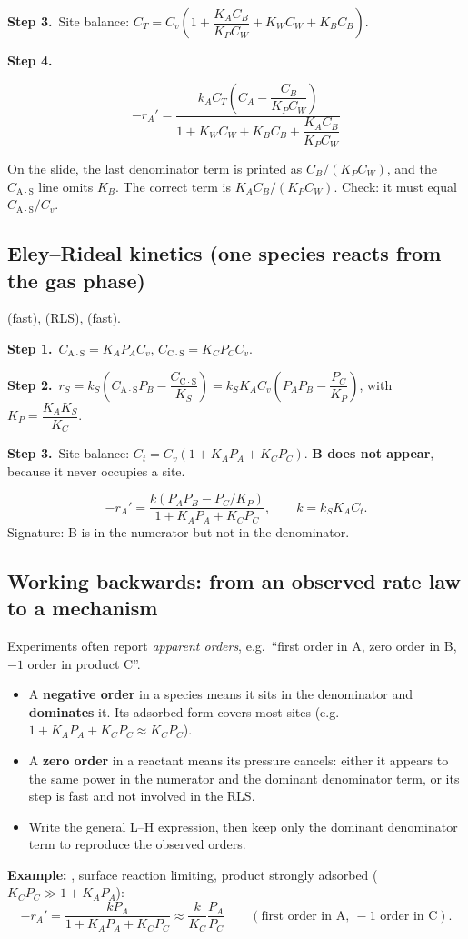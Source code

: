 \documentclass[11pt]{article}
\newcommand{\step}[1]{\par\smallskip\textcolor{stepgray}{\textbf{Step #1.}}\ }
\newcommand{\AS}[1]{\mathrm{#1\!\cdot\!S}}
\begin{document}
\step{3}Site balance: $C_T=C_v\left(1+\dfrac{K_AC_B}{K_PC_W}+K_WC_W+K_BC_B\right)$.

\step{4}
\begin{keyresult}
\[
-r_A'=\frac{k_AC_T\left(C_A-\dfrac{C_B}{K_PC_W}\right)}{1+K_WC_W+K_BC_B+\dfrac{K_AC_B}{K_PC_W}}
\]
\end{keyresult}
\begin{mistake}
On the slide, the last denominator term is printed as $C_B/(K_PC_W)$, and the $C_{\AS{A}}$ line omits $K_B$. The correct
term is $K_AC_B/(K_PC_W)$. Check: it must equal $C_{\AS{A}}/C_v$.
\end{mistake}

\subsection{Eley--Rideal kinetics (one species reacts from the gas phase)}
 (fast), \underline{} (RLS),  (fast).

\step{1}$C_{\AS{A}}=K_AP_AC_v$, \;$C_{\AS{C}}=K_CP_CC_v$.

\step{2}$r_S=k_S\left(C_{\AS{A}}P_B-\dfrac{C_{\AS{C}}}{K_S}\right)=k_SK_AC_v\left(P_AP_B-\dfrac{P_C}{K_P}\right)$, with $K_P=\dfrac{K_AK_S}{K_C}$.

\step{3}Site balance: $C_t=C_v(1+K_AP_A+K_CP_C)$. \textbf{B does not appear}, because it never occupies a site.
\begin{keyresult}
\[
-r_A'=\frac{k\left(P_AP_B-P_C/K_P\right)}{1+K_AP_A+K_CP_C},\qquad k=k_SK_AC_t .
\]
Signature: B is in the numerator but not in the denominator.
\end{keyresult}

\subsection{Working backwards: from an observed rate law to a mechanism}
Experiments often report \emph{apparent orders}, e.g.\ ``first order in A, zero order in B, $-1$ order in product C''.
\begin{itemize}
\item A \textbf{negative order} in a species means it sits in the denominator and \textbf{dominates} it. Its adsorbed
form covers most sites (e.g.\ $1+K_AP_A+K_CP_C\approx K_CP_C$).
\item A \textbf{zero order} in a reactant means its pressure cancels: either it appears to the same power in the
numerator and the dominant denominator term, or its step is fast and not involved in the RLS.
\item Write the general L--H expression, then keep only the dominant denominator term to reproduce the observed orders.
\end{itemize}
\textbf{Example:} , surface reaction limiting, product strongly adsorbed ($K_CP_C\gg1+K_AP_A$):
\[
-r_A'=\frac{kP_A}{1+K_AP_A+K_CP_C}\approx\frac{k}{K_C}\frac{P_A}{P_C}\qquad(\text{first order in A},\ -1\text{ order in C}).
\]
\end{document}
